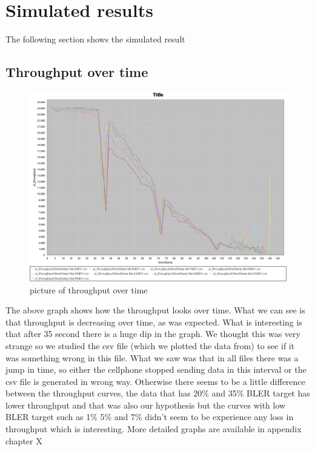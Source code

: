 \documentclass[cropmarks, frame, english]{idamasterthesis}
\begin{document}
\newpage


\section{Simulated results}
The following section shows the simulated result

\subsection{Throughput over time}

\begin{figure}[h]
\includegraphics[width=\textwidth]{ulThroughputOverTime}
\centering
\caption{picture of throughput over time}
\end{figure}

The above graph shows how the throughput looks over time. What we can see is that throughput is decreasing over time, as was expected. What is interesting is that after 35 second there is a huge dip in the graph. We thought this was very strange so we studied the csv file (which we plotted the data from) to see if it was something wrong in this file. What we saw was that in all files there was a jump in time, so either the cellphone stopped sending data in this interval or the csv file is generated in wrong way. Otherwise there seems to be a little difference between the throughput curves, the data that has 20\% and 35\% BLER target has lower throughput and that was also our hypothesis but the curves with low BLER target such as 1\% 5\% and 7\% didn't seem to be experience any loss in throughput which is interesting. More detailed graphs are available in appendix chapter X
\end{document}

